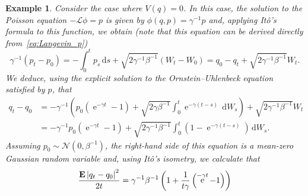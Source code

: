 \documentclass[11pt,a4paper]{article}
\DeclareMathOperator{\e}{e}
\newcommand{\expect}[0]{\mathbf{E}}
\renewcommand{\d}{\mathrm d}
\theoremstyle{plain}
\newtheorem{example}{Example}[section]
\numberwithin{equation}{section}
\begin{document}
\begin{example}
    Consider the case where $V(q) = 0$.
    In this case, the solution to the Poisson equation $- \mathcal L \phi = p$ is given by $\phi(q, p) = \gamma^{-1} p$ and,
    applying Itô's formula to this function, we obtain
    (note that this equation can be derived directly from~\eqref{eq:Langevin_p})
    \[
        \gamma^{-1}(p_t - p_0) = - \int_{0}^{t} p_s \, \d s + \sqrt{2 \gamma^{-1} \beta^{-1}} (W_t - W_0)
        = q_0 - q_t + \sqrt{2 \gamma^{-1} \beta^{-1}} W_t.
    \]
    We deduce, using the explicit solution to the Ornstein--Uhlenbeck equation satisfied by $p$, that
    \begin{align*}
        q_t - q_0
        &= - \gamma^{-1} \left( p_0 \left(\e^{-\gamma t} - 1\right) + \sqrt{2 \gamma \beta^{-1}}\int_{0}^{t} \e^{-\gamma (t - s)} \, \d W_s \right)
        + \sqrt{2 \gamma^{-1} \beta^{-1}} W_t \\
        &=  - \gamma^{-1} p_0 \left(\e^{-\gamma t} - 1\right) + \sqrt{2 \gamma^{-1} \beta^{-1}}\int_{0}^{t} \left(1 - \e^{-\gamma (t - s)}\right) \, \d W_s.
    \end{align*}
    Assuming $p_0 \sim \mathcal N(0, \beta^{-1})$,
    the right-hand side of this equation is a mean-zero Gaussian random variable and,
    using It\^o's isometry, we calculate that
    \[
        \frac{\expect \abs{q_t - q_0}^2}{2t} = \gamma^{-1} \beta^{-1} \left( 1 + \frac{1}{t \gamma} \left(\e^{-\gamma t} - 1\right) \right)
    \]
\end{example}
\end{document}

